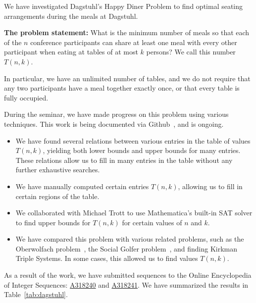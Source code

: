 \documentclass[a4paper]{article}
\begin{document}
We have investigated Dagstuhl's Happy Diner Problem to find optimal seating arrangements during the meals at Dagstuhl. 

\textbf{The problem statement:} What is the minimum number of meals so
that each of the $n$ conference participants can share at least one
meal with every other participant when eating at tables of at most $k$
persons?  We call this number $T(n,k)$.

In particular, we have an unlimited number of tables, and we do not
require that any two participants have a meal together exactly once,
or that every table is fully occupied.

\medskip

During the seminar, we have made progress on this problem using
various techniques.  This work is being documented via
Github~\cite{dagstuhl-gh}, and is ongoing.

\begin{itemize}
\item We have found several relations between various entries in the
  table of values $T(n,k)$, yielding both lower bounds and upper
  bounds for many entries. These relations allow us to fill in many
  entries in the table without any further exhaustive searches.
\item We have manually computed certain entries $T(n,k)$, allowing us
  to fill in certain regions of the table.
\item We collaborated with Michael Trott to use Mathematica's built-in SAT solver to find upper bounds for 
  $T(n,k)$ for certain values of $n$ and $k$.
\item We have compared this problem with various related problems,
  such as the Oberwolfach problem~\cite{oberwolfach}, the Social
  Golfer problem~\cite{golf-mathworld,golf-oeis}, and finding Kirkman
  Triple Systems\cite{kirkman-rch}.  In some cases, this allowed us
to find values $T(n,k)$.
\end{itemize}

As a result of the work, we have submitted sequences to the Online
Encyclopedia of Integer Sequences:
\href{https://oeis.org/draft/A318240}{A318240} and
\href{https://oeis.org/draft/A318241}{A318241}.
We have summarized the results in Table~\ref{tab:dagstuhl}.
\end{document}
